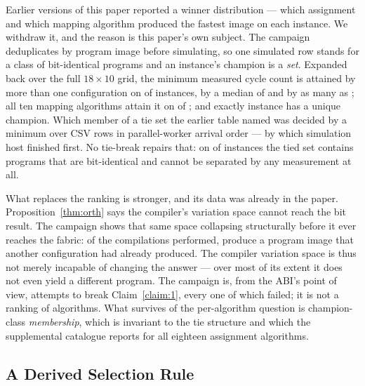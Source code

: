 \documentclass[journal,10pt]{IEEEtran}
\theoremstyle{plain}
\theoremstyle{definition}
\theoremstyle{remark}
\begin{document}
Earlier versions of this paper reported a winner distribution --- which
assignment and which mapping algorithm produced the fastest image on each
instance. We withdraw it, and the reason is this paper's own subject. The
campaign deduplicates by program image before simulating, so one simulated row
stands for a class of bit-identical programs and an instance's champion is a
\emph{set}. Expanded back over the full $18\times10$ grid, the minimum measured
cycle count is attained by more than one configuration on \ClsTied{} of
\TournNInst{} instances, by a median of \ClsMedian{} and by as many as
\ClsMax{}; all ten mapping algorithms attain it on \ClsAllMappings{} of
\TournNInst{}; and exactly \ClsUnique{} instance has a unique champion. Which
member of a tie set the earlier table named was decided by a minimum over CSV
rows in parallel-worker arrival order --- by which simulation host finished
first. No tie-break repairs that: on \ClsTied{} of \TournNInst{} instances the
tied set contains programs that are bit-identical and cannot be separated by
any measurement at all.

What replaces the ranking is stronger, and its data was already in the paper.
Proposition~\ref{thm:orth} says the compiler's variation space cannot reach
the bit result. The campaign shows that same space collapsing structurally
before it ever reaches the fabric: of the \ClsCompilations{} compilations
performed, \ClsCollapse{} produce a program image that another configuration
had already produced. The compiler variation space is thus not merely
incapable of changing the answer --- over most of its extent it does not even
yield a different program. The campaign is, from the ABI's point of view,
\WallTBs{} attempts to break Claim~\ref{claim:1}, every one of which failed;
it is not a ranking of algorithms. What survives of the per-algorithm
question is champion-class \emph{membership}, which is invariant to the tie
structure and which the supplemental catalogue reports for all eighteen
assignment algorithms.

\subsection{A Derived Selection Rule}\label{sec:selrule}

\begin{table}[!t]\centering\footnotesize
\caption{Held-out performance of the portfolio against its size $k$. Leave-one-out is the optimistic protocol; holding out a whole topology is the honest one, since instances sharing a topology are not independent. $k{=}4$ is the knee: $k{=}5$ is identical to four decimals. Intervals are 95\% bootstrap CIs, $B{=}2000$, resampling the \TournNInst{} instances.}\label{tab:ksweep}

\end{table}
\end{document}
